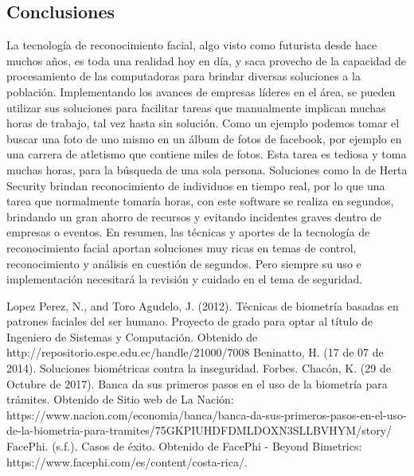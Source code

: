 \documentclass[conference]{IEEEtran}
\begin{document}
\subsection{Conclusiones}
La tecnología de reconocimiento facial, algo visto como futurista desde hace muchos años, es toda una realidad hoy en día, y saca provecho de la capacidad de procesamiento de las 
computadoras para brindar diversas soluciones a la población. Implementando los avances de empresas líderes en el área, se pueden utilizar sus soluciones para 
facilitar tareas que manualmente implican muchas horas de trabajo, tal vez hasta sin solución. Como un ejemplo podemos tomar el buscar una foto de uno mismo en un álbum de fotos de facebook, por ejemplo en una carrera de atletismo que contiene miles de fotos. Esta tarea es tediosa y toma muchas horas, para la búsqueda de una sola persona. Soluciones como la de Herta Security brindan reconocimiento de individuos en tiempo real, por lo que una tarea que normalmente tomaría horas, con este software se realiza en segundos, brindando un gran ahorro de recursos y evitando incidentes graves dentro de empresas o eventos.
En resumen, las técnicas y aportes de la tecnología de reconocimiento facial aportan soluciones muy ricas en temas de control, reconocimiento y análisis en cuestión de segundos. Pero siempre su uso e implementación necesitará la revisión y cuidado en el tema de seguridad.


\begin{thebibliography}{00}
 Lopez Perez, N., and Toro Agudelo, J. (2012). Técnicas de biometría basadas en patrones faciales del ser humano. Proyecto de grado para optar al título de Ingeniero de Sistemas y Computación. Obtenido de http://repositorio.espe.edu.ec/handle/21000/7008
 Beninatto, H. (17 de 07 de 2014). Soluciones biométricas contra la inseguridad. Forbes.
 Chacón, K. (29 de Octubre de 2017). Banca da sus primeros pasos en el uso de la biometría para trámites. Obtenido de Sitio web de La Nación: https://www.nacion.com/economia/banca/banca-da-sus-primeros-pasos-en-el-uso-de-la-biometria-para-tramites/75GKPIUHDFDMLDOXN3SLLBVHYM/story/
 FacePhi. (s.f.). Casos de éxito. Obtenido de FacePhi - Beyond Bimetrics: https://www.facephi.com/es/content/costa-rica/.
\end{thebibliography}
\end{document}
